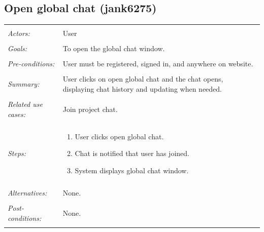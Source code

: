 \documentclass[11pt]{report}
\begin{document}
\subsection{Open global chat (jank6275)}
\begin{tabular}{ p{2cm} p{12cm} }
 \hline
 \\
 \textit{Actors:} & User \\ 
 \\
 \textit{Goals:} & To open the global chat window. \\
 \\
 \textit{Pre-conditions:} & User must be registered, signed in, and anywhere on website.  \\
 \\
 \textit{Summary:} & User clicks on open global chat and the chat opens, displaying chat history and updating when needed. \\ 
 \\
 \textit{Related use cases:} & Join project chat. \\ 
 \\
 \textit{Steps:} & \begin{enumerate}
  \item User clicks open global chat.
  \item Chat is notified that user has joined.
  \item System displays global chat window.
 \end{enumerate} \\
 \\
 \textit{Alternatives:} & None. \\
 \\
 \textit{Post-conditions:} & None. \\
 \\
\hline
\end{tabular}
\end{document}
